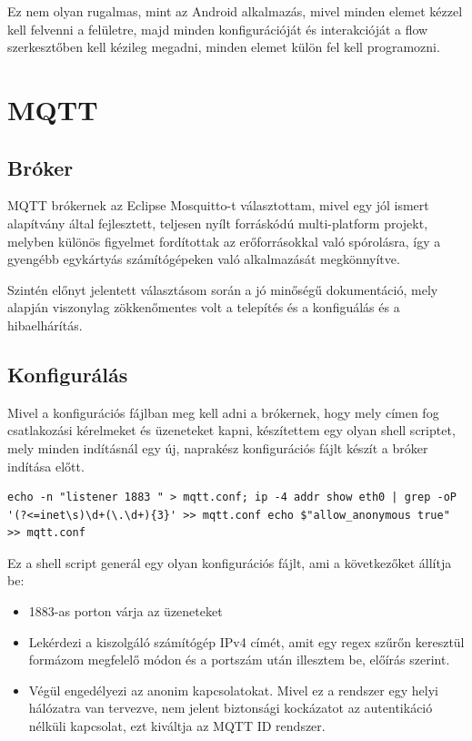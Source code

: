 \documentclass[]{thesis-ekf}
\theoremstyle{definition}
\theoremstyle{remark}
\begin{document}
Ez nem olyan rugalmas, mint az Android alkalmazás, mivel minden
elemet kézzel kell felvenni a felületre, majd minden konfigurációját és interakcióját a flow szerkesztőben kell kézileg megadni, minden elemet külön fel kell programozni.

\section{MQTT}
\subsection{Bróker}
MQTT brókernek az Eclipse Mosquitto\cite{mosquitto}-t választottam, mivel egy jól ismert alapítvány által fejlesztett, teljesen nyílt forráskódú multi-platform projekt,
melyben különös figyelmet fordítottak az erőforrásokkal való spórolásra, így a gyengébb egykártyás számítógépeken való alkalmazását megkönnyítve. 

Szintén előnyt jelentett választásom során a jó minőségű dokumentáció, mely alapján
viszonylag zökkenőmentes volt a telepítés és a konfiguálás és a hibaelhárítás.
\subsection{Konfigurálás}
Mivel a konfigurációs fájlban meg kell adni a brókernek, hogy mely címen fog csatlakozási kérelmeket és üzeneteket kapni,
készítettem egy olyan shell scriptet, mely minden indításnál egy új, naprakész konfigurációs fájlt készít a bróker indítása előtt.

\lstset{language=bash} 
\label{configGenerator}
\begin{lstlisting}[frame=single]
echo -n "listener 1883 " > mqtt.conf; ip -4 addr show eth0 | grep -oP '(?<=inet\s)\d+(\.\d+){3}' >> mqtt.conf echo $"allow_anonymous true" >> mqtt.conf
\end{lstlisting}

Ez a shell script generál egy olyan konfigurációs fájlt, ami a következőket állítja be:
\begin{itemize}
	\item 1883-as porton várja az üzeneteket
	\item Lekérdezi a kiszolgáló számítógép IPv4 címét, amit egy regex szűrőn keresztül formázom megfelelő módon és a portszám után illesztem be, előírás szerint.
	\item Végül engedélyezi az anonim kapcsolatokat. Mivel ez a rendszer egy helyi hálózatra van tervezve, nem jelent biztonsági kockázatot az autentikáció nélküli kapcsolat, ezt kiváltja az MQTT ID rendszer.
\end{itemize}
\end{document}
